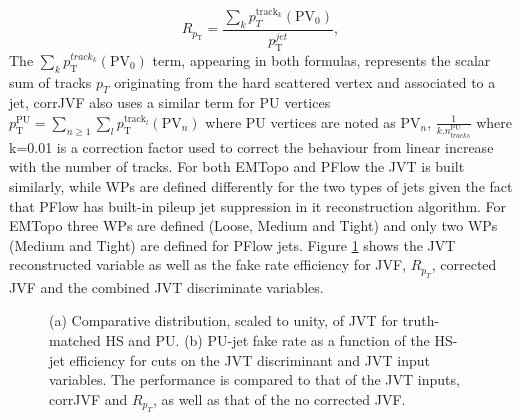 \begin{equation}
    R_{p_{\mathrm{T}}}=\frac{\sum_{k} p_{T}^{\mathrm{track}_{k}}\left(\mathrm{PV}_{0}\right)}{p_{\mathrm{T}}^{j e t}},
\end{equation}
The  $\sum_{k} p_{\mathrm{T}}^{{track}_{k}}\left(\mathrm{PV}_{0}\right)$ term, appearing in both formulas, represents the scalar sum of tracks $p_T$ originating from the hard scattered vertex and associated to a jet, corrJVF also uses a similar term for PU vertices $p_{\mathrm{T}}^{\mathrm{PU}}=\sum_{n \geq 1} \sum_{l} p_{\mathrm{T}}^{\mathrm{track}_{l}}\left(\mathrm{PV}_{n}\right)$  where PU vertices are noted as $\mathrm{PV}_{n}$, $\frac{1}{k . n_{tracks }^{\mathrm{PU}}}$ where k=0.01 is a correction factor used to correct the behaviour from linear increase with the number of tracks. For both EMTopo and PFlow the JVT is built similarly, while WPs are defined differently for the two types of jets given the fact that PFlow has built-in pileup jet suppression in it reconstruction algorithm. For EMTopo three WPs are defined (Loose, Medium and Tight) and only two WPs (Medium and Tight) are defined for PFlow jets. Figure \ref{fig:Jet:Tag:JVT} shows the JVT reconstructed variable as well as the fake rate efficiency for JVF, $R_{p_T}$, corrected JVF and the combined JVT discriminate variables.
\begin{figure}[H]
    \centering
    \caption{(a) Comparative distribution, scaled to unity, of JVT for truth-matched HS and PU. (b) PU-jet fake rate as a function of the HS-jet efficiency for cuts on the JVT discriminant and JVT input variables. The performance is compared to that of the JVT inputs, corrJVF and $R_{p_T}$, as well as that of the no corrected JVF.}
    \label{fig:Jet:Tag:JVT}
\end{figure}
